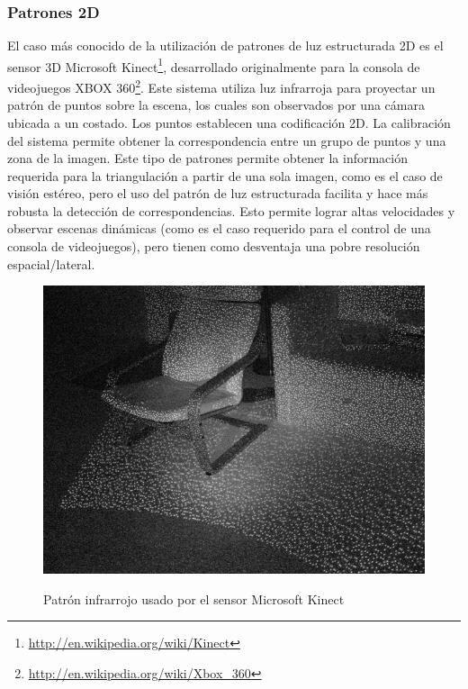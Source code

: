 \subsubsection{Patrones 2D}
El caso más conocido de la utilización de patrones de luz estructurada 2D es el sensor 3D Microsoft Kinect\footnote{\url{http://en.wikipedia.org/wiki/Kinect}}, desarrollado originalmente para la consola de videojuegos XBOX 360\footnote{\url{http://en.wikipedia.org/wiki/Xbox_360}}. Este sistema utiliza luz infrarroja para proyectar un patrón de puntos sobre la escena, los cuales son observados por una cámara ubicada a un costado. Los puntos establecen una codificación 2D. La calibración del sistema permite obtener la correspondencia entre un grupo de puntos y una zona de la imagen. Este tipo de patrones permite obtener la información requerida para la triangulación a partir de una sola imagen, como es el caso de visión estéreo, pero el uso del patrón de luz estructurada facilita y hace más robusta la detección de correspondencias. Esto permite lograr altas velocidades y observar escenas dinámicas (como es el caso requerido para el control de una consola de videojuegos), pero tienen como desventaja una pobre resolución espacial/lateral.

\begin{figure}[bth]
    \myfloatalign
        {\includegraphics[width=1.0\linewidth]{images/structuredLightKinectExample}}
        \caption{Patrón infrarrojo usado por el sensor Microsoft Kinect}
        \label{fig:structuredLightKinectExample}
\end{figure}

